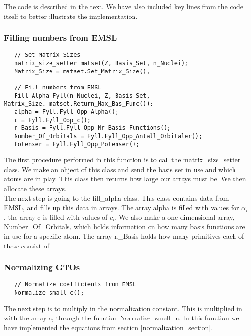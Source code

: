 \documentclass[a4paper,norsk,11pt,twoside]{report}
\begin{document}
The code is described in the text. We have also included key lines
from the code itself to better illustrate the implementation. \\

\subsubsection{Filling numbers from EMSL}
\begin{lstlisting}
   // Set Matrix Sizes
   matrix_size_setter matset(Z, Basis_Set, n_Nuclei);
   Matrix_Size = matset.Set_Matrix_Size();

   // Fill numbers from EMSL
   Fill_Alpha Fyll(n_Nuclei, Z, Basis_Set,
Matrix_Size, matset.Return_Max_Bas_Func());
   alpha = Fyll.Fyll_Opp_Alpha();
   c = Fyll.Fyll_Opp_c();
   n_Basis = Fyll.Fyll_Opp_Nr_Basis_Functions();
   Number_Of_Orbitals = Fyll.Fyll_Opp_Antall_Orbitaler();
   Potenser = Fyll.Fyll_Opp_Potenser();
\end{lstlisting}

The first procedure performed in this function is to call the
matrix\_size\_setter class. We make an object of this class and send
the basis set in use and which atoms are in play. This class then
returns how large our arrays must be. We then allocate these
arrays. \\

The next step is going to the fill\_alpha class. This class contains
data from EMSL, and fills up this data in arrays. The array alpha is
filled with values for $\alpha_i$, the array c is filled with values
of $c_i$. We also
make a one dimensional array, Number\_Of\_Orbitals, which holds
information on how many basis functions are in use for a specific
atom. The array n\_Basis holds how many primitives each of these
consist of. \\

\subsubsection{Normalizing GTOs}
\begin{lstlisting}
   // Normalize coefficients from EMSL
   Normalize_small_c();
\end{lstlisting}

The next step is to multiply in the normalization constant. This is
multiplied in with the array c, through the function
Normalize\_small\_c. In this function we have implemented the
equations from section \ref{normalization_section}. \\
\end{document}
